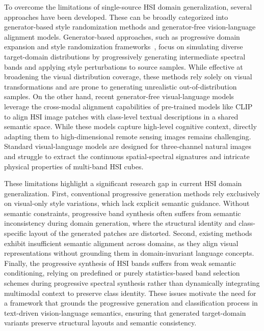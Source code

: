 To overcome the limitations of single-source HSI domain generalization, several approaches have been developed. These can be broadly categorized into generator-based style randomization methods and generator-free vision-language alignment models. Generator-based approaches, such as progressive domain expansion and style randomization frameworks~\cite{li2022progressive}, focus on simulating diverse target-domain distributions by progressively generating intermediate spectral bands and applying style perturbations to source samples. While effective at broadening the visual distribution coverage, these methods rely solely on visual transformations and are prone to generating unrealistic out-of-distribution samples. On the other hand, recent generator-free visual-language models leverage the cross-modal alignment capabilities of pre-trained models like CLIP~\cite{radford2021learning} to align HSI image patches with class-level textual descriptions in a shared semantic space. While these models capture high-level cognitive context, directly adapting them to high-dimensional remote sensing images remains challenging. Standard visual-language models are designed for three-channel natural images and struggle to extract the continuous spatial-spectral signatures and intricate physical properties of multi-band HSI cubes.

These limitations highlight a significant research gap in current HSI domain generalization. First, conventional progressive generation methods rely exclusively on visual-only style variations, which lack explicit semantic guidance. Without semantic constraints, progressive band synthesis often suffers from semantic inconsistency during domain generation, where the structural identity and class-specific layout of the generated patches are distorted. Second, existing methods exhibit insufficient semantic alignment across domains, as they align visual representations without grounding them in domain-invariant language concepts. Finally, the progressive synthesis of HSI bands suffers from weak semantic conditioning, relying on predefined or purely statistics-based band selection schemes during progressive spectral synthesis rather than dynamically integrating multimodal context to preserve class identity. These issues motivate the need for a framework that grounds the progressive generation and classification process in text-driven vision-language semantics, ensuring that generated target-domain variants preserve structural layouts and semantic consistency.

